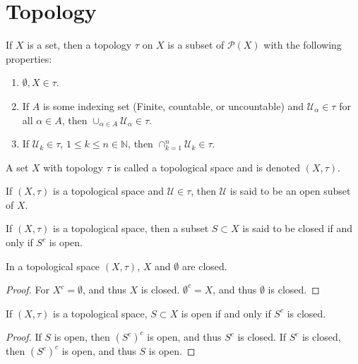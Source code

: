 \documentclass[crop=false,class=book,oneside]{standalone}
\begin{document}
    \section{Topology}
            \begin{definition}
            If $X$ is a set, then a topology $\tau$ on $X$ is a subset of $\mathcal{P}(X)$ with the following properties:
            \begin{enumerate}
            \item $\emptyset, X\in \tau$.
            \item If $A$ is some indexing set (Finite, countable, or uncountable) and $\mathcal{U}_\alpha \in \tau$ for all $\alpha \in A$, then $\cup_{\alpha \in A} \mathcal{U}_{\alpha} \in \tau$.
            \item If $\mathcal{U}_k\in \tau$, $1\leq k \leq n\in \mathbb{N}$, then $\cap_{k=1}^{n}\mathcal{U}_k \in \tau$.
            \end{enumerate}
            \end{definition}
            \begin{definition}
            A set $X$ with topology $\tau$ is called a topological space and is denoted $(X,\tau)$.
            \end{definition}
            \begin{definition}
            If $(X,\tau)$ is a topological space and $\mathcal{U}\in \tau$, then $\mathcal{U}$ is said to be an open subset of $X$.
            \end{definition}
            \begin{definition}
            If $(X,\tau)$ is a topological space, then a subset $S\subset X$ is said to be closed if and only if $S^c$ is open.
            \end{definition}
            \begin{theorem}
            In a topological space $(X,\tau)$, $X$ and $\emptyset$ are closed.
            \end{theorem}
            \begin{proof}
            For $X^c = \emptyset$, and thus $X$ is closed. $\emptyset^c=X$, and thus $\emptyset$ is closed.
            \end{proof}
            \begin{theorem}
            If $(X,\tau)$ is a topological space, $S\subset X$ is open if and only if $S^c$ is closed.
            \end{theorem}
            \begin{proof}
            If $S$ is open, then $(S^c)^c$ is open, and thus $S^c$ is closed. If $S^c$ is closed, then $(S^c)^c$ is open, and thus $S$ is open.
            \end{proof}
\end{document}
